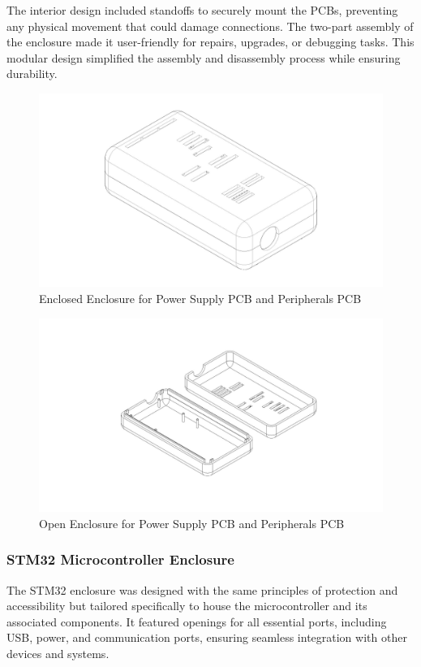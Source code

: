 \documentclass[12pt]{article}
\begin{document}
The interior design included standoffs to securely mount the PCBs, preventing
any physical movement that could damage connections. The two-part assembly of
the enclosure made it user-friendly for repairs, upgrades, or debugging tasks.
This modular design simplified the assembly and disassembly process while
ensuring durability.

\begin{figure}[H]
  \includegraphics[width=\textwidth]{../assets/pcb/image8.jpg}
  \caption{Enclosed Enclosure for Power Supply PCB and Peripherals PCB}
\end{figure}

\begin{figure}[H]
  \includegraphics[width=\textwidth]{../assets/pcb/image9.jpg}
  \caption{Open Enclosure for Power Supply PCB and Peripherals PCB}
\end{figure}


\subsubsection*{STM32 Microcontroller Enclosure}
The STM32 enclosure was designed with the same principles of protection and
accessibility but tailored specifically to house the microcontroller and its
associated components. It featured openings for all essential ports, including
USB, power, and communication ports, ensuring seamless integration with other
devices and systems.
\end{document}
